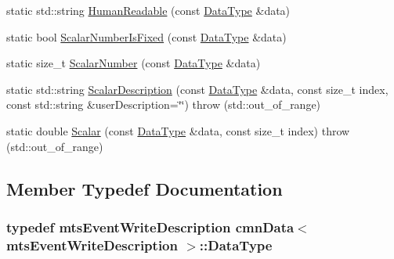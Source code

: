 \begin{DoxyCompactItemize}
\item 
static std\+::string \hyperlink{classcmn_data_3_01mts_event_write_description_01_4_a9a5045186add9f9a0428247d17952763}{Human\+Readable} (const \hyperlink{classcmn_data_3_01mts_event_write_description_01_4_a0c398e4adf26c99124f9f6cd19fb70dc}{Data\+Type} \&data)
\item 
static bool \hyperlink{classcmn_data_3_01mts_event_write_description_01_4_ac35755b8deee1aa7fff1e106b1b3d5e9}{Scalar\+Number\+Is\+Fixed} (const \hyperlink{classcmn_data_3_01mts_event_write_description_01_4_a0c398e4adf26c99124f9f6cd19fb70dc}{Data\+Type} \&data)
\item 
static size\+\_\+t \hyperlink{classcmn_data_3_01mts_event_write_description_01_4_ad175d4f3dfc5a5591b50986f9a339646}{Scalar\+Number} (const \hyperlink{classcmn_data_3_01mts_event_write_description_01_4_a0c398e4adf26c99124f9f6cd19fb70dc}{Data\+Type} \&data)
\item 
static std\+::string \hyperlink{classcmn_data_3_01mts_event_write_description_01_4_ac4180d154c1762a844b4d0d9ea873340}{Scalar\+Description} (const \hyperlink{classcmn_data_3_01mts_event_write_description_01_4_a0c398e4adf26c99124f9f6cd19fb70dc}{Data\+Type} \&data, const size\+\_\+t index, const std\+::string \&user\+Description=\char`\"{}\char`\"{})  throw (std\+::out\+\_\+of\+\_\+range)
\item 
static double \hyperlink{classcmn_data_3_01mts_event_write_description_01_4_a933a9283178eb60fe5c3d29d7fdbbc33}{Scalar} (const \hyperlink{classcmn_data_3_01mts_event_write_description_01_4_a0c398e4adf26c99124f9f6cd19fb70dc}{Data\+Type} \&data, const size\+\_\+t index)  throw (std\+::out\+\_\+of\+\_\+range)
\end{DoxyCompactItemize}


\subsection{Member Typedef Documentation}
\hypertarget{classcmn_data_3_01mts_event_write_description_01_4_a0c398e4adf26c99124f9f6cd19fb70dc}{}
\subsubsection[{Data\+Type}]{\setlength{\rightskip}{0pt plus 5cm}typedef {\bf mts\+Event\+Write\+Description} {\bf cmn\+Data}$<$ {\bf mts\+Event\+Write\+Description} $>$\+::{\bf Data\+Type}}\label{classcmn_data_3_01mts_event_write_description_01_4_a0c398e4adf26c99124f9f6cd19fb70dc}


